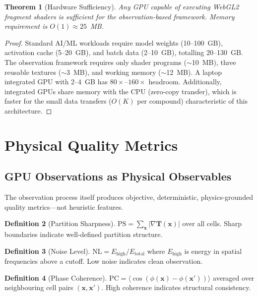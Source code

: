 \documentclass[11pt,twocolumn,a4paper]{article}
\newtheorem{theorem}{Theorem}[section]
\theoremstyle{definition}
\newtheorem{definition}[theorem]{Definition}
\theoremstyle{remark}
\newcommand{\Texture}{\mathbf{T}}
\begin{document}
\begin{theorem}[Hardware Sufficiency]
\label{thm:hardware}
Any GPU capable of executing WebGL2 \citep{khronos2017} fragment shaders is sufficient for the observation-based framework. Memory requirement is $O(1) \approx 25$~MB.
\end{theorem}

\begin{proof}
Standard AI/ML workloads require model weights (10--100~GB), activation cache (5--20~GB), and batch data (2--10~GB), totalling 20--130~GB. The observation framework requires only shader programs ($\sim$10~MB), three reusable textures ($\sim$3~MB), and working memory ($\sim$12~MB). A laptop integrated GPU with 2--4~GB has $80\times$--$160\times$ headroom. Additionally, integrated GPUs share memory with the CPU (zero-copy transfer), which is faster for the small data transfers ($O(K)$ per compound) characteristic of this architecture.
\end{proof}

\section{Physical Quality Metrics}
\label{sec:quality}

\subsection{GPU Observations as Physical Observables}

The observation process itself produces objective, deterministic, physics-grounded quality metrics---not heuristic features.

\begin{definition}[Partition Sharpness]
$\mathrm{PS} = \sum_{\mathbf{x}} |\nabla \Texture(\mathbf{x})|$ over all cells. Sharp boundaries indicate well-defined partition structure.
\end{definition}

\begin{definition}[Noise Level]
$\mathrm{NL} = E_{\mathrm{high}} / E_{\mathrm{total}}$ where $E_{\mathrm{high}}$ is energy in spatial frequencies above a cutoff. Low noise indicates clean observation.
\end{definition}

\begin{definition}[Phase Coherence]
$\mathrm{PC} = \langle \cos(\phi(\mathbf{x}) - \phi(\mathbf{x}')) \rangle$ averaged over neighbouring cell pairs $(\mathbf{x}, \mathbf{x}')$. High coherence indicates structural consistency.
\end{definition}
\end{document}
